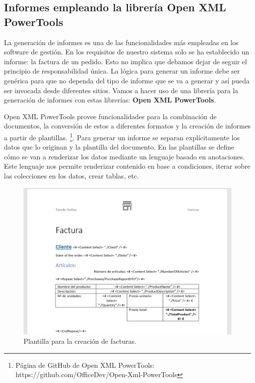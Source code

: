 \documentclass[11pt,spanish,listoffigures]{tfgetsinf}
\begin{document}
\subsection{Informes empleando la librería Open XML PowerTools}

La generación de informes es una de las funcionalidades más empleadas en los software de gestión. En los requisitos de nuestro sistema solo se ha establecido un informe: la factura de un pedido. Esto no implica que debamos dejar de seguir el principio de responsabilidad única. La lógica para generar un informe debe ser genérica para que no dependa del tipo de informe que se va a generar y así pueda ser invocada desde diferentes sitios. Vamos a hacer uso de una librería para la generación de informes con estas librerías: \textbf{Open XML PowerTools}.

Open XML PowerTools provee funcionalidades para la combinación de documentos, la conversión de estos a diferentes formatos y la creación de informes a partir de plantillas. \footnote{ Página de GitHub de Open XML PowerTools: https://github.com/OfficeDev/Open-Xml-PowerTools}. Para generar un informe se separan explícitamente los datos que lo originan y la plantilla del documento. En las plantillas se define cómo se van a renderizar los datos mediante un lenguaje basado en anotaciones. Este lenguaje nos permite renderizar contenido en base a condiciones, iterar sobre las colecciones en los datos, crear tablas, etc.

\begin{figure}[h]
\centering
\includegraphics[scale=0.5]{Factura}
\caption{Plantilla para la creación de facturas.}
\end{figure}
\end{document}
